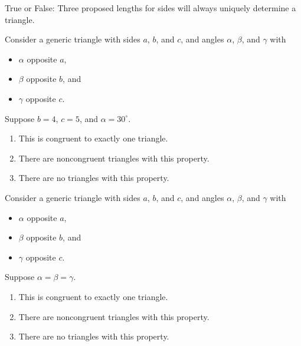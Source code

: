 \documentclass[nooutcomes,noauthor]{ximera}
\author{Bart Snapp}
\begin{document}
\maketitle



\begin{exercise} True or False:  %
  Three proposed lengths for sides will always uniquely determine a
  triangle.
\end{exercise}



\begin{exercise}
  Consider a generic triangle with sides $a$, $b$, and $c$, and angles
  $\alpha$, $\beta$, and $\gamma$ with
  \begin{itemize}
  \item $\alpha$ opposite $a$,
  \item $\beta$ opposite $b$, and
  \item $\gamma$ opposite $c$.
  \end{itemize}
  Suppose $b=4$, $c=5$, and $\alpha = 30^\circ$.
  \begin{enumerate}
  \item This is congruent to exactly one triangle.
  \item There are noncongruent triangles with this property.
  \item There are no triangles with this property.
  \end{enumerate}
\end{exercise}

\begin{exercise}
  Consider a generic triangle with sides $a$, $b$, and $c$, and angles
  $\alpha$, $\beta$, and $\gamma$ with
  \begin{itemize}
  \item $\alpha$ opposite $a$,
  \item $\beta$ opposite $b$, and
  \item $\gamma$ opposite $c$.
  \end{itemize}
  Suppose $\alpha = \beta = \gamma$.
  \begin{enumerate}
  \item This is congruent to exactly one triangle.
  \item There are noncongruent triangles with this property.
  \item There are no triangles with this property.
  \end{enumerate}
\end{exercise}
\end{document}
